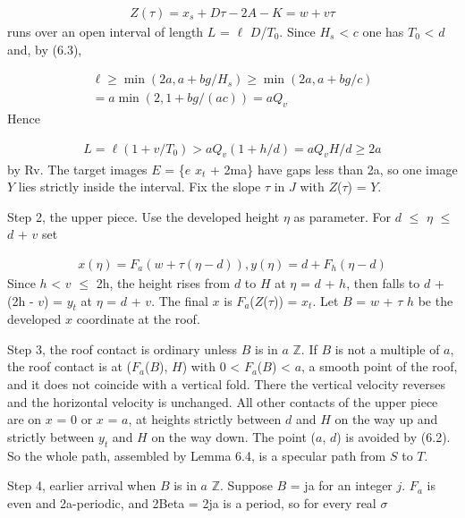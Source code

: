 \documentclass[11pt]{article}
\newcommand{\Beta}{B}
\begin{document}
\begin{gather*}
Z(\tau) = x_{s} + D \tau - 2A - K = w + v \tau
\end{gather*}
runs over an open interval of length \(L\) = \(\ell\) \(D\)/\(T_{0}\). Since \(H_{s}\) < \(c\) one has \(T_{0}\) < \(d\) and, by (6.3),

\begin{gather*}
\ell \ge  \min(2a, a + bg/H_{s}) \ge  \min(2a, a + bg/c) \\
= a \min(2, 1 + bg/(ac)) = a Q_{v}
\end{gather*}
Hence

\begin{gather*}
L = \ell (1 + v/T_{0}) > a Q_{v} (1 + h/d) = a Q_{v} H/d \ge  2a
\end{gather*}
by Rv. The target images \(E\) = \{\(e\) \(x_{t}\) + 2ma\} have gaps less than 2a, so one image \(Y\) lies strictly inside the interval. Fix the slope \(\tau\) in \(J\) with \(Z\)(\(\tau\)) = \(Y\).

Step 2, the upper piece. Use the developed height \(\eta\) as parameter. For \(d\) \(\le\) \(\eta\) \(\le\) \(d\) + \(v\) set

\begin{gather*}
x(\eta) = F_{a}(w + \tau (\eta - d)),   y(\eta) = d + F_{h}(\eta - d)
\end{gather*}
Since \(h\) < \(v\) \(\le\) 2h, the height rises from \(d\) to \(H\) at \(\eta\) = \(d\) + \(h\), then falls to \(d\) + (2h - \(v\)) = \(y_{t}\) at \(\eta\) = \(d\) + \(v\). The final \(x\) is \(F_{a}\)(\(Z\)(\(\tau\))) = \(x_{t}\). Let \(\Beta\) = \(w\) + \(\tau\) \(h\) be the developed \(x\) coordinate at the roof.

Step 3, the roof contact is ordinary unless \(\Beta\) is in \(a\) \(\mathbb{Z}\). If \(\Beta\) is not a multiple of \(a\), the roof contact is at (\(F_{a}\)(\(\Beta\)), \(H\)) with 0 < \(F_{a}\)(\(\Beta\)) < \(a\), a smooth point of the roof, and it does not coincide with a vertical fold. There the vertical velocity reverses and the horizontal velocity is unchanged. All other contacts of the upper piece are on \(x\) = 0 or \(x\) = \(a\), at heights strictly between \(d\) and \(H\) on the way up and strictly between \(y_{t}\) and \(H\) on the way down. The point (\(a\), \(d\)) is avoided by (6.2). So the whole path, assembled by Lemma 6.4, is a specular path from \(S\) to \(T\).

Step 4, earlier arrival when \(\Beta\) is in \(a\) \(\mathbb{Z}\). Suppose \(\Beta\) = ja for an integer \(j\). \(F_{a}\) is even and 2a-periodic, and 2Beta = 2ja is a period, so for every real \(\sigma\)
\end{document}
